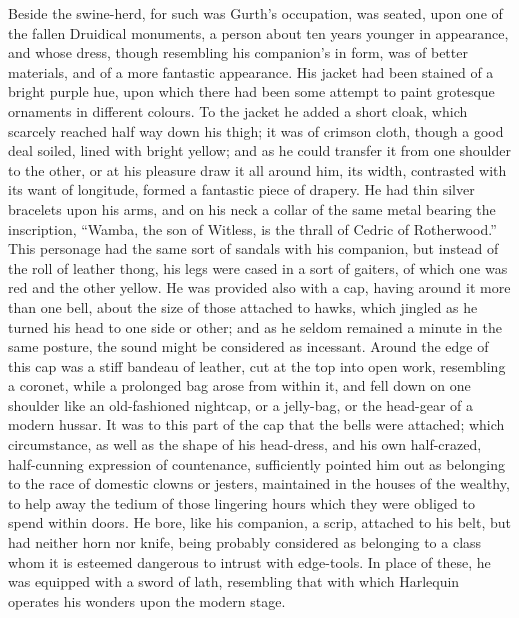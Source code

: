 Beside the swine-herd, for such was Gurth's occupation, was seated, upon
one of the fallen Druidical monuments, a person about ten years younger
in appearance, and whose dress, though resembling his companion's in
form, was of better materials, and of a more fantastic appearance. His
jacket had been stained of a bright purple hue, upon which there had
been some attempt to paint grotesque ornaments in different colours. To
the jacket he added a short cloak, which scarcely reached half way down
his thigh; it was of crimson cloth, though a good deal soiled, lined
with bright yellow; and as he could transfer it from one shoulder to the
other, or at his pleasure draw it all around him, its width, contrasted
with its want of longitude, formed a fantastic piece of drapery. He had
thin silver bracelets upon his arms, and on his neck a collar of the
same metal bearing the inscription, ``Wamba, the son of Witless, is the
thrall of Cedric of Rotherwood.'' This personage had the same sort of
sandals with his companion, but instead of the roll of leather thong,
his legs were cased in a sort of gaiters, of which one was red and the
other yellow. He was provided also with a cap, having around it more
than one bell, about the size of those attached to hawks, which jingled
as he turned his head to one side or other; and as he seldom remained a
minute in the same posture, the sound might be considered as incessant.
Around the edge of this cap was a stiff bandeau of leather, cut at the
top into open work, resembling a coronet, while a prolonged bag arose
from within it, and fell down on one shoulder like an old-fashioned
nightcap, or a jelly-bag, or the head-gear of a modern hussar. It was to
this part of the cap that the bells were attached; which circumstance,
as well as the shape of his head-dress, and his own half-crazed,
half-cunning expression of countenance, sufficiently pointed him out as
belonging to the race of domestic clowns or jesters, maintained in the
houses of the wealthy, to help away the tedium of those lingering hours
which they were obliged to spend within doors. He bore, like his
companion, a scrip, attached to his belt, but had neither horn nor
knife, being probably considered as belonging to a class whom it is
esteemed dangerous to intrust with edge-tools. In place of these, he was
equipped with a sword of lath, resembling that with which Harlequin
operates his wonders upon the modern stage.

